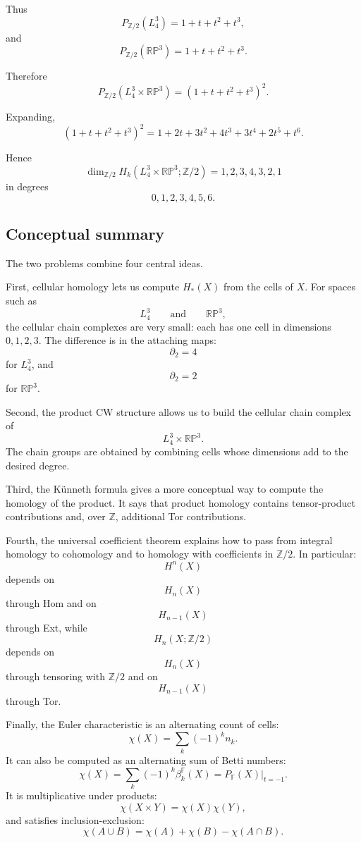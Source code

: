 \documentclass[12pt,a4paper]{article}
\theoremstyle{notespace}
\begin{document}
Thus
\[
P_{\mathbb Z/2}(L_4^3)=1+t+t^2+t^3,
\]
and
\[
P_{\mathbb Z/2}(\mathbb{RP}^3)=1+t+t^2+t^3.
\]

Therefore
\[
P_{\mathbb Z/2}(L_4^3\times \mathbb{RP}^3)
=
(1+t+t^2+t^3)^2.
\]

Expanding,
\[
(1+t+t^2+t^3)^2
=
1+2t+3t^2+4t^3+3t^4+2t^5+t^6.
\]

Hence
\[
\dim_{\mathbb Z/2}H_k(L_4^3\times \mathbb{RP}^3;\mathbb Z/2)
=
1,2,3,4,3,2,1
\]
in degrees
\[
0,1,2,3,4,5,6.
\]

\subsection{Conceptual summary}

The two problems combine four central ideas.

First, cellular homology lets us compute \(H_*(X)\) from the cells of \(X\). For spaces such as
\[
L_4^3
\qquad\text{and}\qquad
\mathbb{RP}^3,
\]
the cellular chain complexes are very small: each has one cell in dimensions \(0,1,2,3\). The difference is in the attaching maps:
\[
\partial_2=4
\]
for \(L_4^3\), and
\[
\partial_2=2
\]
for \(\mathbb{RP}^3\).

Second, the product CW structure allows us to build the cellular chain complex of
\[
L_4^3\times \mathbb{RP}^3.
\]
The chain groups are obtained by combining cells whose dimensions add to the desired degree.

Third, the Künneth formula gives a more conceptual way to compute the homology of the product. It says that product homology contains tensor-product contributions and, over \(\mathbb Z\), additional Tor contributions.

Fourth, the universal coefficient theorem explains how to pass from integral homology to cohomology and to homology with coefficients in \(\mathbb Z/2\). In particular:
\[
H^n(X)
\]
depends on
\[
H_n(X)
\]
through Hom and on
\[
H_{n-1}(X)
\]
through Ext, while
\[
H_n(X;\mathbb Z/2)
\]
depends on
\[
H_n(X)
\]
through tensoring with \(\mathbb Z/2\) and on
\[
H_{n-1}(X)
\]
through Tor.

Finally, the Euler characteristic is an alternating count of cells:
\[
\chi(X)=\sum_k(-1)^k n_k.
\]
It can also be computed as an alternating sum of Betti numbers:
\[
\chi(X)=\sum_k(-1)^k\beta_k^{\mathbb F}(X)
=
P_{\mathbb F}(X)\big|_{t=-1}.
\]
It is multiplicative under products:
\[
\chi(X\times Y)=\chi(X)\chi(Y),
\]
and satisfies inclusion-exclusion:
\[
\chi(A\cup B)=\chi(A)+\chi(B)-\chi(A\cap B).
\]
\end{document}
